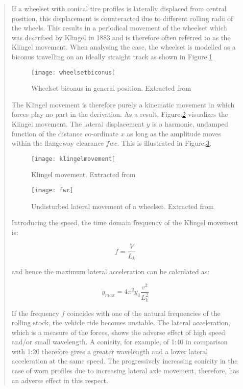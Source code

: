 \begin{quote}
If a wheelset with conical tire profiles is laterally displaced from central position, this displacement is counteracted due to different rolling radii of the wheels. This results in a periodical movement of the wheelset which was described by Klingel in 1883 and is therefore often referred to as the Klingel movement. When analysing the case, the wheelset is modelled as a biconus travelling on an ideally straight track as shown in Figure.\ref{fig:wheelsetbiconus}

\begin{figure}[h]
    \centering
    \texttt{[image: wheelsetbiconus]}
    \caption{Wheelset biconus in general position. Extracted from \citet[Figure 2.2]{esveld2001modern}}
    \label{fig:wheelsetbiconus}
\end{figure}


The Klingel movement is therefore purely a kinematic movement in which forces play no part in the derivation. As a result, Figure.\ref{fig:klingelmovement} visualizes the Klingel movement. The lateral displacement $y$ is a harmonic, undamped function of the distance co-ordinate $x$ as long as the amplitude moves within the flangeway clearance $fwc$. This is illustrated in Figure.\ref{fig:fwc}.

\begin{figure}[h]
    \centering
    \texttt{[image: klingelmovement]}
    \caption{Klingel movement. Extracted from \citet[Figure 2.3]{esveld2001modern}}
    \label{fig:klingelmovement}
\end{figure}

\begin{figure}[h]
    \centering
    \texttt{[image: fwc]}
    \caption{Undisturbed lateral movement of a wheelset. Extracted from \citet[Figure 2.4]{esveld2001modern}}
    \label{fig:fwc}
\end{figure}

Introducing the speed, the time domain frequency of the Klingel movement is:

$$ f = \frac{V}{L_k} $$

and hence the maximum lateral acceleration can be calculated as:

$$\ddot{y}_{max} = 4\pi^2y_0\frac{v^2}{L_k^2}$$

If the frequency $f$ coincides with one of the natural frequencies of the rolling stock, the vehicle ride becomes unstable. The lateral acceleration, which is a measure of the forces, shows the adverse effect of high speed and/or small wavelength. A conicity, for example, of 1:40 in comparison with 1:20 therefore gives a greater wavelength and a lower lateral acceleration at the same speed. The progressively increasing conicity in the case of worn profiles due to increasing lateral axle movement, therefore, has an adverse effect in this respect.
\end{quote}
